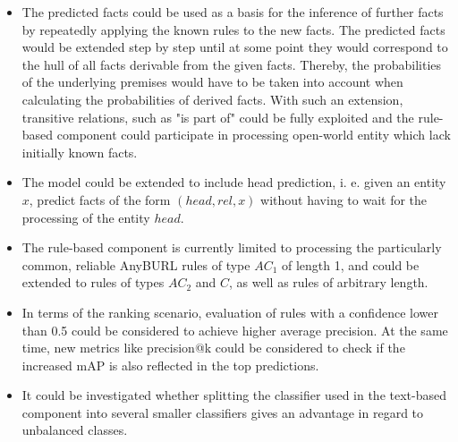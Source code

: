 \begin{itemize}
    \item The predicted facts could be used as a basis for the inference of further facts by repeatedly applying the known rules to the new facts. The predicted facts would be extended step by step until at some point they would correspond to the hull of all facts derivable from the given facts. Thereby, the probabilities of the underlying premises would have to be taken into account when calculating the probabilities of derived facts. With such an extension, transitive relations, such as "is part of" could be fully exploited and the rule-based component could participate in processing open-world entity which lack initially known facts.

    \item The model could be extended to include head prediction, i. e. given an entity $x$, predict facts of the form $(head, rel, x)$ without having to wait for the processing of the entity $head$.

    \item The rule-based component is currently limited to processing the particularly common, reliable AnyBURL rules of type $AC_1$ of length 1, and could be extended to rules of types $AC_2$ and $C$, as well as rules of arbitrary length.

    \item In terms of the ranking scenario, evaluation of rules with a confidence lower than 0.5 could be considered to achieve higher average precision. At the same time, new metrics like precision@k could be considered to check if the increased mAP is also reflected in the top predictions.

    \item It could be investigated whether splitting the classifier used in the text-based component into several smaller classifiers gives an advantage in regard to unbalanced classes.
\end{itemize}
